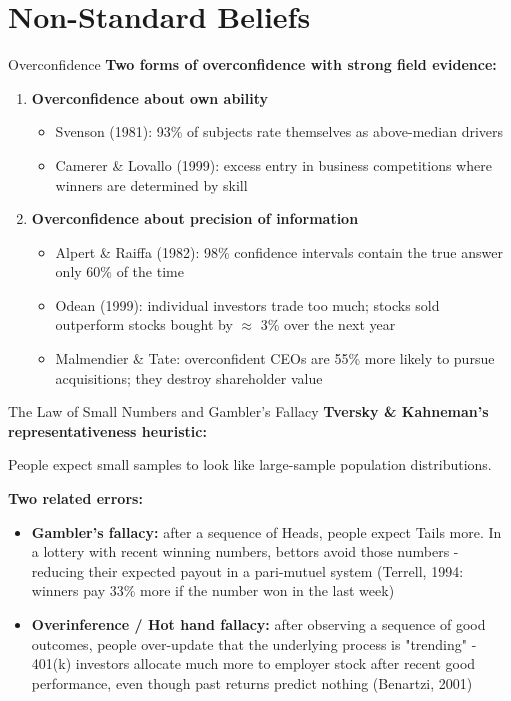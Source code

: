 \documentclass[10pt]{beamer}
\begin{document}
\section{Non-Standard Beliefs}

\begin{frame}{Overconfidence}
\textbf{Two forms of overconfidence with strong field evidence:}


\begin{enumerate}
\item \textbf{Overconfidence about own ability}
\begin{itemize}
\item Svenson (1981): 93\% of subjects rate themselves as above-median drivers
\item Camerer \& Lovallo (1999): excess entry in business competitions where winners are determined by skill
\end{itemize}


\item \textbf{Overconfidence about precision of information}
\begin{itemize}
\item Alpert \& Raiffa (1982): 98\% confidence intervals contain the true answer only 60\% of the time
\item \alert{Odean (1999)}: individual investors trade too much; stocks sold outperform stocks bought by $\approx$ 3\% over the next year
\item \alert{Malmendier \& Tate}: overconfident CEOs are 55\% more likely to pursue acquisitions; they destroy shareholder value
\end{itemize}
\end{enumerate}
\end{frame}


\begin{frame}{The Law of Small Numbers and Gambler's Fallacy}
\textbf{Tversky \& Kahneman's representativeness heuristic:}

People expect small samples to look like large-sample population distributions.


\textbf{Two related errors:}

\begin{itemize}
\item \textbf{Gambler's fallacy:} after a sequence of Heads, people expect Tails more.
In a lottery with recent winning numbers, bettors avoid those numbers - \alert{reducing their expected payout} in a pari-mutuel system (Terrell, 1994: winners pay 33\% more if the number won in the last week)


\item \textbf{Overinference / Hot hand fallacy:} after observing a sequence of good outcomes, people over-update that the underlying process is "trending"
- 401(k) investors allocate much more to employer stock after recent good performance, even though past returns predict nothing (Benartzi, 2001)
\end{itemize}
\end{frame}
\end{document}
